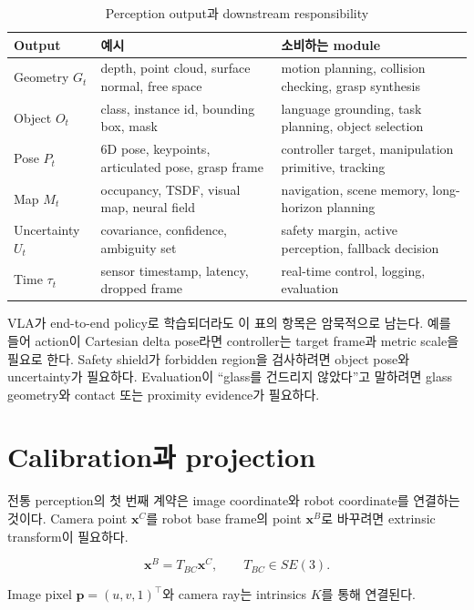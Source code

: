 \begin{table}[ht]
\centering
\caption{Perception output과 downstream responsibility}
\label{tab:perception-contract}
\small
\begin{tabularx}{\textwidth}{p{25mm}X X}
\toprule
Output & 예시 & 소비하는 module \\
\midrule
Geometry $G_t$ & depth, point cloud, surface normal, free space & motion planning, collision checking, grasp synthesis \\
Object $O_t$ & class, instance id, bounding box, mask & language grounding, task planning, object selection \\
Pose $P_t$ & 6D pose, keypoints, articulated pose, grasp frame & controller target, manipulation primitive, tracking \\
Map $M_t$ & occupancy, TSDF, visual map, neural field & navigation, scene memory, long-horizon planning \\
Uncertainty $U_t$ & covariance, confidence, ambiguity set & safety margin, active perception, fallback decision \\
Time $\tau_t$ & sensor timestamp, latency, dropped frame & real-time control, logging, evaluation \\
\bottomrule
\end{tabularx}
\end{table}

VLA가 end-to-end policy로 학습되더라도 이 표의 항목은 암묵적으로 남는다. 예를 들어 action이 Cartesian delta pose라면 controller는 target frame과 metric scale을 필요로 한다. Safety shield가 forbidden region을 검사하려면 object pose와 uncertainty가 필요하다. Evaluation이 ``glass를 건드리지 않았다''고 말하려면 glass geometry와 contact 또는 proximity evidence가 필요하다.

\section{Calibration과 projection}

전통 perception의 첫 번째 계약은 image coordinate와 robot coordinate를 연결하는 것이다. Camera point $\bm{x}^C$를 robot base frame의 point $\bm{x}^B$로 바꾸려면 extrinsic transform이 필요하다.

\begin{equation}
  \bm{x}^{B} = T_{BC}\bm{x}^{C},
  \qquad
  T_{BC}\in SE(3).
  \label{eq:perception-frame-transform}
\end{equation}

Image pixel $\bm{p}=(u,v,1)^\top$와 camera ray는 intrinsics $K$를 통해 연결된다.

